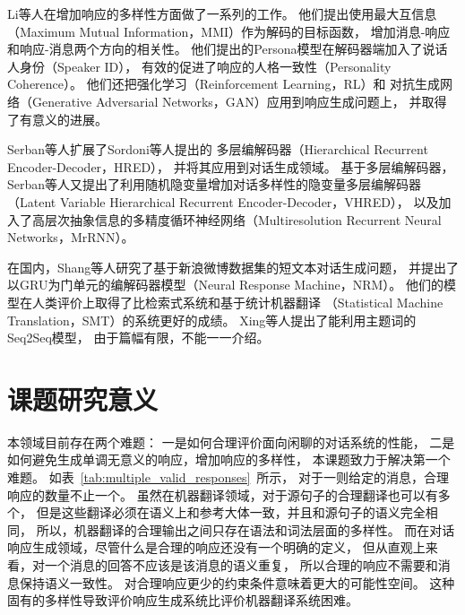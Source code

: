 Li等人在增加响应的多样性方面做了一系列的工作。
他们提出使用最大互信息（Maximum Mutual Information，MMI）作为解码的目标函数，
增加消息-响应和响应-消息两个方向的相关性。
他们提出的Persona模型在解码器端加入了说话人身份（Speaker ID），
有效的促进了响应的人格一致性（Personality Coherence）。
他们还把强化学习（Reinforcement Learning，RL）和
对抗生成网络（Generative Adversarial Networks，GAN）应用到响应生成问题上，
并取得了有意义的进展。

Serban等人扩展了Sordoni等人提出的
多层编解码器（Hierarchical Recurrent Encoder-Decoder，HRED），
并将其应用到对话生成领域。
基于多层编解码器，Serban等人又提出了利用随机隐变量增加对话多样性的隐变量多层编解码器
（Latent Variable Hierarchical Recurrent Encoder-Decoder，VHRED），
以及加入了高层次抽象信息的多精度循环神经网络（Multiresolution Recurrent Neural Networks，MrRNN）。

在国内，Shang等人研究了基于新浪微博数据集的短文本对话生成问题，
并提出了以GRU为门单元的编解码器模型（Neural Response Machine，NRM）。
他们的模型在人类评价上取得了比检索式系统和基于统计机器翻译
（Statistical Machine Translation，SMT）的系统更好的成绩。
Xing等人提出了能利用主题词的Seq2Seq模型，
由于篇幅有限，不能一一介绍。


\section{课题研究意义}\label{sec:research_meaning}
本领域目前存在两个难题：
一是如何合理评价面向闲聊的对话系统的性能，
二是如何避免生成单调无意义的响应，增加响应的多样性，
本课题致力于解决第一个难题。
如表~\ref{tab:multiple_valid_responses}~所示，
对于一则给定的消息，合理响应的数量不止一个。
虽然在机器翻译领域，对于源句子的合理翻译也可以有多个，
但是这些翻译必须在语义上和参考大体一致，并且和源句子的语义完全相同，
所以，机器翻译的合理输出之间只存在语法和词法层面的多样性。
而在对话响应生成领域，尽管什么是合理的响应还没有一个明确的定义，
但从直观上来看，对一个消息的回答不应该是该消息的语义重复，
所以合理的响应不需要和消息保持语义一致性。
对合理响应更少的约束条件意味着更大的可能性空间。
这种固有的多样性导致评价响应生成系统比评价机器翻译系统困难。

